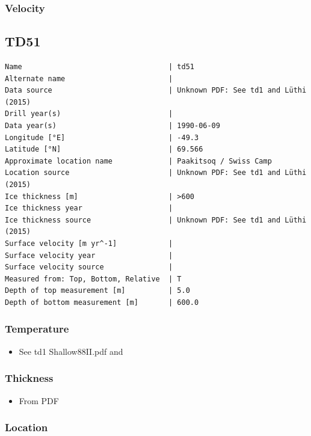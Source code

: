 \documentclass[article,a4paper,times,11pt,twoside]{article}
\begin{document}
\subsubsection{Velocity}
\label{sec:org0c7d9d7}
\clearpage
\subsection{TD51}
\label{sec:org827c842}
\begin{verbatim}
Name                                  | td51
Alternate name                        | 
Data source                           | Unknown PDF: See td1 and Lüthi (2015)
Drill year(s)                         | 
Data year(s)                          | 1990-06-09
Longitude [°E]                        | -49.3
Latitude [°N]                         | 69.566
Approximate location name             | Paakitsoq / Swiss Camp
Location source                       | Unknown PDF: See td1 and Lüthi (2015)
Ice thickness [m]                     | >600
Ice thickness year                    | 
Ice thickness source                  | Unknown PDF: See td1 and Lüthi (2015)
Surface velocity [m yr^-1]            | 
Surface velocity year                 | 
Surface velocity source               | 
Measured from: Top, Bottom, Relative  | T
Depth of top measurement [m]          | 5.0
Depth of bottom measurement [m]       | 600.0
\end{verbatim}

\subsubsection{Temperature}
\label{sec:org03abd23}

\begin{itemize}
\item See td1 Shallow88II.pdf and \textcite{luthi_2015}
\end{itemize}

\subsubsection{Thickness}
\label{sec:orgfd7a5e5}

\begin{itemize}
\item From PDF
\end{itemize}

\subsubsection{Location}
\label{sec:org20965de}
\end{document}
